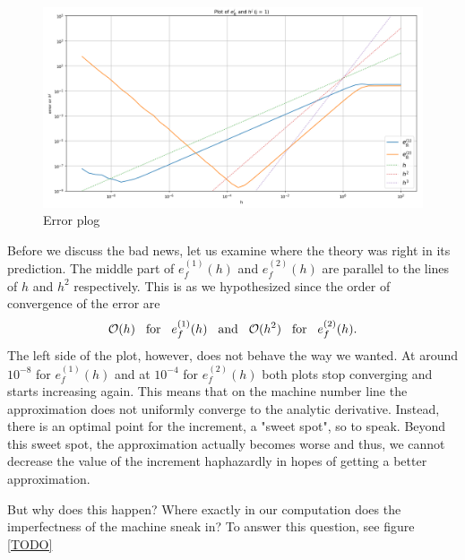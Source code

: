 \begin{figure}[h!]
    \includegraphics[width=\linewidth]{graphics/error_plot/exp1_error_plot.png}
    \caption{Error plog}
    \label{fig:exp1_error_plot}
\end{figure}

Before we discuss the bad news, let us examine where the theory was right in its prediction. The middle part of \(e_f^{(1)}(h)\) and \(e_f^{(2)}(h)\) are parallel to the lines of \(h\) and \(h^2\) respectively. This is as we hypothesized since the order of convergence of the error are
\[\mathcal{O}(h) \hspace{0.3cm} \text{for} \hspace{0.3cm} e_f^{(1)}(h) \hspace{0.3cm} \text{and} \hspace{0.3cm} \mathcal{O}(h^2) \hspace{0.3cm} \text{for} \hspace{0.3cm} e_f^{(2)}(h) \text{.}\]
The left side of the plot, however, does not behave the way we wanted. At around \(10^{-8}\) for \(e_f^{(1)}(h)\) and at \(10^{-4}\) for \(e_f^{(2)}(h)\) both plots stop converging and starts increasing again. This means that on the machine number line the approximation does not uniformly converge to the analytic derivative. Instead, there is an optimal point for the increment, a "sweet spot", so to speak. Beyond this sweet spot, the approximation actually becomes worse and thus, we cannot decrease the value of the increment haphazardly in hopes of getting a better approximation.

But why does this happen? Where exactly in our computation does the imperfectness of the machine sneak in? To answer this question, see figure \ref{TODO}


